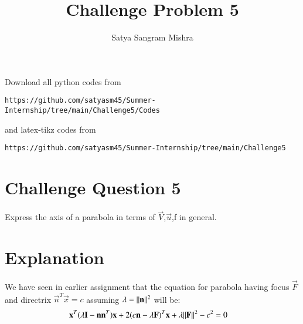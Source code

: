 \documentclass[journal,12pt,twocolumn]{IEEEtran}
\begin{document}
     \def\centbox#1{\makebox[0in]{#1}}
     \def\topbox#1{\raisebox{-\baselineskip}[0in][0in]{#1}}
     \def\midbox#1{\raisebox{-0.5\baselineskip}[0in][0in]{#1}}
\vspace{3cm}
\title{Challenge Problem 5}
\author{Satya Sangram Mishra}
\maketitle
\newpage
\bigskip
\renewcommand{\thefigure}{\theenumi}
\renewcommand{\thetable}{\theenumi}
Download all python codes from 
\begin{lstlisting}
https://github.com/satyasm45/Summer-Internship/tree/main/Challenge5/Codes
\end{lstlisting}
%
and latex-tikz codes from 
%
\begin{lstlisting}
https://github.com/satyasm45/Summer-Internship/tree/main/Challenge5
\end{lstlisting}
%
\section{Challenge Question 5}
Express the axis of a parabola in terms of $\vec{V}$,$\vec{u}$,f in general.
%
\section{Explanation}
We have seen in earlier assignment that the equation for parabola having focus $\vec{F}$ and directrix $\vec{n}^T\vec{x}=c$ assuming $\lambda=\lVert\mathbf{n}\rVert^2$ will be: 
\begin{align}
\mathbf{x}^T(\lambda\mathbf{I}-\mathbf{n}\mathbf{n}^T)\mathbf{x}+2(c\mathbf{n}-\lambda\mathbf{F})^T\mathbf{x}+\lambda\lVert\mathbf{F}\rVert^2-c^2&=0\label{eq:8}
\end{align}
\end{document}
